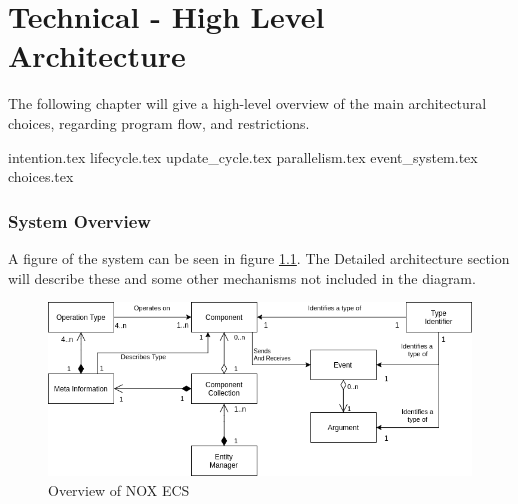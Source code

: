 \chapter{Technical - High Level Architecture}
\label{chap:technical_high_level_architecture}
The following chapter will give a high-level overview of the main architectural
choices, regarding program flow, and restrictions.

{intention.tex}
{lifecycle.tex}
{update_cycle.tex}
{parallelism.tex}
{event_system.tex}
{choices.tex}

\subsection{System Overview}
A figure of the system can be seen in figure \ref{fig:nox_ecs_uml}.
The Detailed architecture section will describe these and some other mechanisms not included in the diagram.

\begin{figure}[tbp]
    \begin{center}
    \includegraphics[scale=0.45]{images/nox_ecs_uml.png}
    \caption{Overview of NOX ECS}
    \label{fig:nox_ecs_uml}
    \end{center}
\end{figure}

